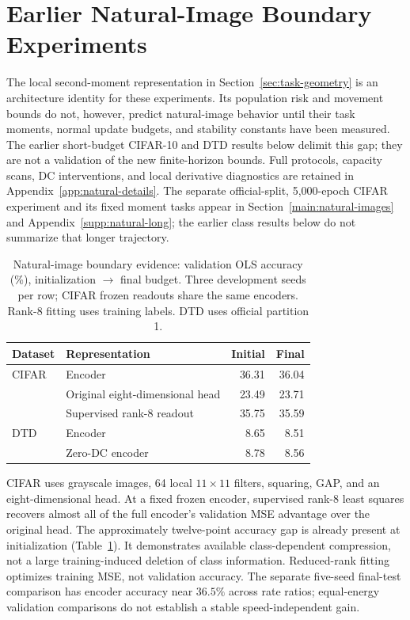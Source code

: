 \section{Earlier Natural-Image Boundary Experiments}
\label{sec:cifar}
The local second-moment representation in Section~\ref{sec:task-geometry} is an architecture identity for these experiments. Its population risk and movement bounds do not, however, predict natural-image behavior until their task moments, normal update budgets, and stability constants have been measured. The earlier short-budget CIFAR-10 and DTD results below delimit this gap; they are not a validation of the new finite-horizon bounds. Full protocols, capacity scans, DC interventions, and local derivative diagnostics are retained in Appendix~\ref{app:natural-details}. The separate official-split, 5,000-epoch CIFAR experiment and its fixed moment tasks appear in Section~\ref{main:natural-images} and Appendix~\ref{supp:natural-long}; the earlier class results below do not summarize that longer trajectory.

\begin{table}[t]
\centering\small
\caption{Natural-image boundary evidence: validation OLS accuracy (\%), initialization $\to$ final budget. Three development seeds per row; CIFAR frozen readouts share the same encoders. Rank-8 fitting uses training labels. DTD uses official partition 1.}
\label{tab:natural-boundary}
\setlength{\tabcolsep}{4pt}
\begin{tabular}{llrr}
\toprule
Dataset&Representation&Initial&Final\\\midrule
CIFAR&Encoder&36.31&36.04\\
&Original eight-dimensional head&23.49&23.71\\
&Supervised rank-8 readout&35.75&35.59\\\midrule
DTD&Encoder&8.65&8.51\\
&Zero-DC encoder&8.78&8.56\\
\bottomrule
\end{tabular}
\end{table}

CIFAR uses grayscale images, 64 local $11\times11$ filters, squaring, GAP, and an eight-dimensional head. At a fixed frozen encoder, supervised rank-8 least squares recovers almost all of the full encoder's validation MSE advantage over the original head. The approximately twelve-point accuracy gap is already present at initialization (Table~\ref{tab:natural-boundary}). It demonstrates available class-dependent compression, not a large training-induced deletion of class information. Reduced-rank fitting optimizes training MSE, not validation accuracy. The separate five-seed final-test comparison has encoder accuracy near $36.5\%$ across rate ratios; equal-energy validation comparisons do not establish a stable speed-independent gain.

